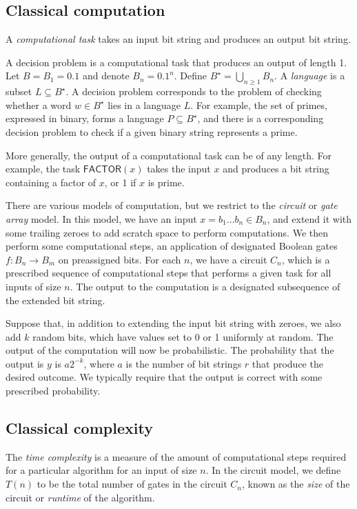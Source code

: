 \subsection{Classical computation}
A \emph{computational task} takes an input bit string and produces an output bit string.

A decision problem is a computational task that produces an output of length 1.
Let \( B = B_1 = \qty{0,1} \) and denote \( B_n = \qty{0,1}^n \).
Define \( B^\star = \bigcup_{n \geq 1} B_n \).
A \emph{language} is a subset \( L \subseteq B^\star \).
A decision problem corresponds to the problem of checking whether a word \( w \in B^\star \) lies in a language \( L \).
For example, the set of primes, expressed in binary, forms a language \( P \subseteq B^\star \), and there is a corresponding decision problem to check if a given binary string represents a prime.

More generally, the output of a computational task can be of any length.
For example, the task \( \mathsf{FACTOR}(x) \) takes the input \( x \) and produces a bit string containing a factor of \( x \), or 1 if \( x \) is prime.

There are various models of computation, but we restrict to the \emph{circuit} or \emph{gate array} model.
In this model, we have an input \( x = b_1 \dots b_n \in B_n \), and extend it with some trailing zeroes to add scratch space to perform computations.
We then perform some computational steps, an application of designated Boolean gates \( f \colon B_n \to B_m \) on preassigned bits.
For each \( n \), we have a circuit \( C_n \), which is a prescribed sequence of computational steps that performs a given task for all inputs of size \( n \).
The output to the computation is a designated subsequence of the extended bit string.

Suppose that, in addition to extending the input bit string with zeroes, we also add \( k \) random bits, which have values set to 0 or 1 uniformly at random.
The output of the computation will now be probabilistic.
The probability that the output is \( y \) is \( a2^{-k} \), where \( a \) is the number of bit strings \( r \) that produce the desired outcome.
We typically require that the output is correct with some prescribed probability.

\subsection{Classical complexity}
The \emph{time complexity} is a measure of the amount of computational steps required for a particular algorithm for an input of size \( n \).
In the circuit model, we define \( T(n) \) to be the total number of gates in the circuit \( C_n \), known as the \emph{size} of the circuit or \emph{runtime} of the algorithm.


